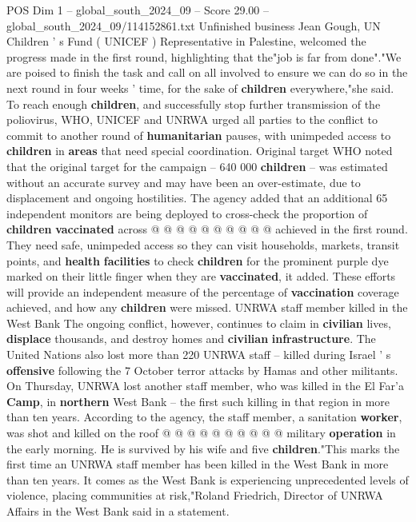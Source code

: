 \begin{textsample}{POS Dim 1 – global\_south\_2024\_09 – Score 29.00 – global\_south\_2024\_09/114152861.txt}
Unfinished business Jean Gough, UN Children ' s Fund ( UNICEF ) Representative in Palestine, welcomed the progress made in the first round, highlighting that the"job is far from done"."We are poised to finish the task and call on all involved to ensure we can do so in the next round in four weeks ' time, for the sake of \textbf{children} everywhere,"she said.
To reach enough \textbf{children}, and successfully stop further transmission of the poliovirus, WHO, UNICEF and UNRWA urged all parties to the conflict to commit to another round of \textbf{humanitarian} pauses, with unimpeded access to \textbf{children} in \textbf{areas} that need special coordination.
Original target WHO noted that the original target for the campaign -- 640 000 \textbf{children} -- was estimated without an accurate survey and may have been an over-estimate, due to displacement and ongoing hostilities.
The agency added that an additional 65 independent monitors are being deployed to cross-check the proportion of \textbf{children} \textbf{vaccinated} across @ @ @ @ @ @ @ @ @ @ achieved in the first round.
They need safe, unimpeded access so they can visit households, markets, transit points, and \textbf{health} \textbf{facilities} to check \textbf{children} for the prominent purple dye marked on their little finger when they are \textbf{vaccinated}, it added.
These efforts will provide an independent measure of the percentage of \textbf{vaccination} coverage achieved, and how any \textbf{children} were missed.
UNRWA staff member killed in the West Bank The ongoing conflict, however, continues to claim in \textbf{civilian} lives, \textbf{displace} thousands, and destroy homes and \textbf{civilian} \textbf{infrastructure}.
The United Nations also lost more than 220 UNRWA staff -- killed during Israel ' s \textbf{offensive} following the 7 October terror attacks by Hamas and other militants.
On Thursday, UNRWA lost another staff member, who was killed in the El Far'a \textbf{Camp}, in \textbf{northern} West Bank -- the first such killing in that region in more than ten years.
According to the agency, the staff member, a sanitation \textbf{worker}, was shot and killed on the roof @ @ @ @ @ @ @ @ @ @ military \textbf{operation} in the early morning.
He is survived by his wife and five \textbf{children}."This marks the first time an UNRWA staff member has been killed in the West Bank in more than ten years.
It comes as the West Bank is experiencing unprecedented levels of violence, placing communities at risk,"Roland Friedrich, Director of UNRWA Affairs in the West Bank said in a statement.

\end{textsample}
